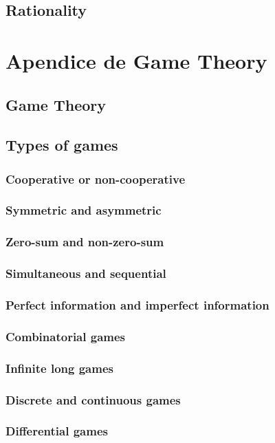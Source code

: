     \section{Rationality}
    
\chapter{Apendice de Game Theory}
    \section{Game Theory} 
    \section{Types of games}
        \subsection{Cooperative or non-cooperative}
        \subsection{Symmetric and asymmetric}
        \subsection{Zero-sum and non-zero-sum}
        \subsection{Simultaneous and sequential}   
        \subsection{Perfect information and imperfect information}
        \subsection{Combinatorial games}
        \subsection{Infinite long games}
        \subsection{Discrete and continuous games}
        \subsection{Differential games}
